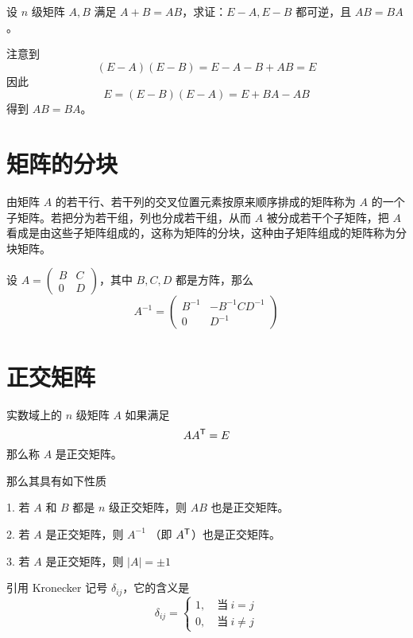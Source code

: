 \begin{example}
	设 $n$ 级矩阵 $A, B$ 满足 $A + B = AB$，求证：$E - A, E - B$ 都可逆，且 $AB = BA$。
\end{example}

\begin{solution}
	注意到
	\[ (E-A)(E-B) = E - A - B + AB = E \]
	因此
	\[ E = (E-B)(E-A) = E + BA - AB \]
	得到 $AB = BA$。
\end{solution}

\section{矩阵的分块}

由矩阵 $A$ 的若干行、若干列的交叉位置元素按原来顺序排成的矩阵称为 $A$ 的一个子矩阵。若把分为若干组，列也分成若干组，从而 $A$ 被分成若干个子矩阵，把 $A$ 看成是由这些子矩阵组成的，这称为矩阵的分块，这种由子矩阵组成的矩阵称为分块矩阵。

\begin{theorem}
	设 $A = \left(\begin{matrix} B & C\\ 0 & D \end{matrix}\right)$，其中 $B,C,D$ 都是方阵，那么
	\[A^{-1} = \left(\begin{matrix} B^{-1} & -B^{-1}CD^{-1}\\ 0 & D^{-1} \end{matrix}\right)\]
\end{theorem}

\section{正交矩阵}

\begin{definition}
	实数域上的 $n$ 级矩阵 $A$ 如果满足
	\[A{A}^\mathsf{T}=E\]
	那么称 $A$ 是正交矩阵。
\end{definition}

那么其具有如下性质

1. 若 $A$ 和  $B$ 都是 $n$ 级正交矩阵，则 $AB$ 也是正交矩阵。

2. 若 $A$ 是正交矩阵，则 $A^{-1}$ （即 ${A}^\mathsf{T}$）也是正交矩阵。

3. 若 $A$ 是正交矩阵，则 $|A|=\pm 1$


引用 Kronecker 记号 $\delta_{ij}$，它的含义是
\[\delta_{ij}=\begin{cases}
		1,\quad \text{当}\ i = j \\
		0,\quad \text{当}\ i \ne j
	\end{cases}\]

